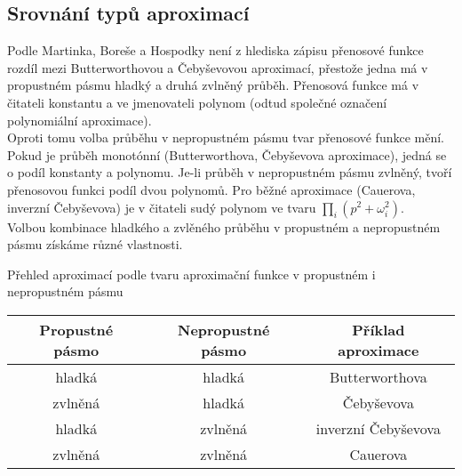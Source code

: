 \subsection{Srovnání typů aproximací}
Podle Martinka, Boreše a Hospodky \cite{12} není z hlediska zápisu přenosové funkce rozdíl mezi Butterworthovou a Čebyševovou aproximací, přestože jedna má v propustném pásmu hladký a druhá zvlněný průběh. Přenosová funkce má v čitateli konstantu a ve jmenovateli polynom (odtud společné označení polynomiální aproximace).\\
Oproti tomu volba průběhu v nepropustném pásmu tvar přenosové funkce mění. Pokud je průběh monotónní (Butterworthova, Čebyševova aproximace), jedná se o podíl konstanty a polynomu. Je-li průběh v nepropustném pásmu zvlněný, tvoří přenosovou funkci podíl dvou polynomů. Pro běžné aproximace (Cauerova, inverzní Čebyševova) je v čitateli sudý polynom ve tvaru $\prod _{i} (p^2 + \omega_i^2)$.\\
Volbou kombinace hladkého a zvlěného průběhu v propustném a nepropustném pásmu získáme různé vlastnosti.\\
\newpage
 \begin{table}[h]
 \caption[Přehled aproximací podle tvaru aproximační funkce v propustném i nepropustném pásmu]{\label{tab:Přehled aproximací podle tvaru aproximační funkce v propustném i nepropustném pásmu}Přehled aproximací podle tvaru aproximační funkce v propustném i nepropustném pásmu \cite{12}}
  \end{table}
\begin{center}
\begin{table}[h]
\centering
  \begin{tabular}{ | c | c | c | }
    \hline
    Propustné pásmo & Nepropustné pásmo & Příklad aproximace \\ \hline
    hladká & hladká & Butterworthova \\ \hline
    zvlněná & hladká & Čebyševova \\ \hline
    hladká & zvlněná & inverzní Čebyševova \\ \hline
    zvlněná & zvlněná & Cauerova \\ \hline
  \end{tabular}
   \end{table}
   \end{center}
